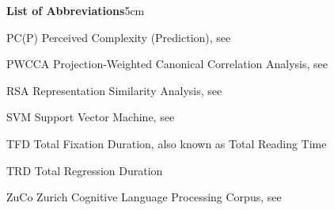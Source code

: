 \begin{mclistof}{\textbf{List of Abbreviations}}{5cm}
\item[PC(P)] Perceived Complexity (Prediction), see \cite{brunato-etal-2018-sentence}

\item[PWCCA] Projection-Weighted Canonical Correlation Analysis, see \cite{morcos-etal-2018-insights}

\item[RSA] Representation Similarity Analysis, see \cite{kriegeskorte-etal-2008-representational}

\item[SVM] Support Vector Machine, see \cite{vapnik-1998-svm}

\item[TFD] Total Fixation Duration, also known as Total Reading Time

\item[TRD] Total Regression Duration

\item[ZuCo] Zurich Cognitive Language Processing Corpus, see \cite{hollenstein-2018-zuco}

\end{mclistof} 
